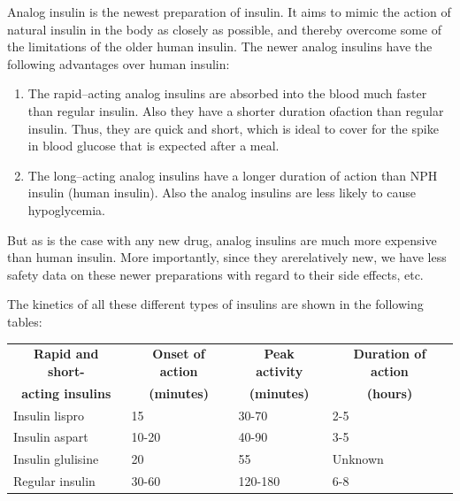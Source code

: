 Analog insulin is the newest preparation of insulin. It aims to mimic the action of natural insulin in the body as closely as possible, and thereby overcome some of the limitations of the older human insulin. The newer analog insulins have the following advantages over human insulin:

\begin{enumerate}[•]
\itemsep=0pt
\item The rapid–acting analog insulins are absorbed into the blood much faster than regular insulin. Also they have a shorter duration of\break action than regular insulin. Thus, they are quick and short, which is ideal to cover for the spike in blood glucose that is expected after a meal.
\item The long–acting analog insulins have a longer duration of action than NPH insulin (human insulin). Also the analog insulins are less likely to cause hypoglycemia.
\end{enumerate}

But as is the case with any new drug, analog insulins are much more expensive than human insulin. More importantly, since they are\break relatively new, we have less safety data on these newer preparations with regard to their side effects, etc.

The kinetics of all these different types of insulins are shown in the following tables:

{
\begin{center}
\small\addtolength{\tabcolsep}{-2pt}
\begin{tabular}{|l|l|l|l|}
\hline
\multicolumn{1}{|c|}{\textbf{Rapid and short-}} & \multicolumn{1}{c|}{\textbf{Onset of action}} & \multicolumn{1}{c|}{\textbf{Peak activity}} & \multicolumn{1}{c|}{\textbf{Duration of action}}\\
\multicolumn{1}{|c|}{\textbf{acting insulins}} & \multicolumn{1}{c|}{\textbf{(minutes)}} & \multicolumn{1}{c|}{\textbf{(minutes)}} & \multicolumn{1}{c|}{\textbf{(hours)}}\\
\hline
Insulin lispro & 15 & 30-70 & 2-5\\
\hline
Insulin aspart & 10-20 & 40-90 & 3-5\\
\hline
Insulin glulisine & 20 & 55 & Unknown\\
\hline
Regular insulin & 30-60 & 120-180 & 6-8\\
\hline
\end{tabular}
\end{center}
}\relax

